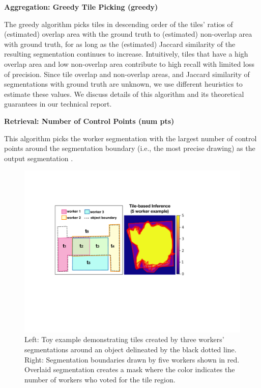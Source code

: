 \documentclass[letterpaper]{article}
\newcommand{\stitle}[1]{\noindent \textbf{#1}}
\begin{document}
\stitle{Aggregation: Greedy Tile Picking (greedy)} 
\par \noindent The greedy algorithm picks tiles in descending order of the tiles' ratios of (estimated) overlap area with the ground truth to (estimated) non-overlap area with ground truth, for as long as the (estimated) Jaccard similarity of the resulting segmentation continues to increase. Intuitively, tiles that have a high overlap area and low non-overlap area contribute to high recall with limited loss of precision.
Since tile overlap and non-overlap areas, and Jaccard similarity of segmentations with ground truth are unknown, we use different heuristics to estimate these values. We discuss details of this algorithm and its theoretical guarantees in our technical report. 

\stitle{Retrieval: Number of Control Points (num pts)}
\par \noindent This algorithm picks the worker segmentation with the largest number of control points around the segmentation boundary (i.e., the most precise drawing) as the output segmentation \cite{Vittayakorn2011,Sorokin2008}.

\begin{figure}[h!]
\centering
\includegraphics[width=0.85\linewidth]{plots/tile.pdf}
\caption{Left: Toy example demonstrating tiles created by three workers' segmentations around an object delineated by the black dotted line. Right: Segmentation boundaries drawn by five workers shown in red. Overlaid segmentation creates a mask where the color indicates the number of workers who voted for the tile region.}
\label{tile_demo}
\end{figure}  
\end{document}
